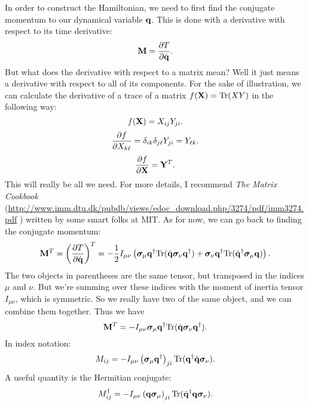 \documentclass[12pt]{article}
\begin{document}
In order to construct the Hamiltonian, we need to first find the conjugate 
momentum to our dynamical variable $\mathbf{q}$. This is done with a derivative with 
respect to its time derivative:
\[ \mathbf{M} = \frac{\partial {T}}{\partial {\dot{\mathbf{q}}}}.\]
But what does the derivative with respect to a matrix mean? Well it just means 
a derivative with respect to all of its components. For the sake of 
illustration, we can calculate the derivative of a trace of a matrix $f(\mathbf{X}) 
= \mathrm{Tr}(XY)$ in the following way:
\[ f(\mathbf{X}) = X_{ij}Y_{ji}.\]
\[ \frac{\partial {f}}{\partial {X_{k\ell}}} = \delta_{ik}\delta_{j \ell} Y_{ji} = Y_{\ell k}.\]
\[ \frac{\partial {f}}{\partial {\mathbf{X}}} = \mathbf{Y} ^T.\]
This will really be all we need. For more details, I recommend \emph{The Matrix 
Cookbook} 
(\url{http://www.imm.dtu.dk/pubdb/views/edoc_download.php/3274/pdf/imm3274.pdf}
) written by some smart folks at MIT. As for now, we can go back to finding the 
conjugate momentum:
\[ \mathbf{M}^T = \left(\frac{\partial {T}}{\partial {\dot{\mathbf{q}}}}\right)^T = -\frac{1}{2}I_{\mu\nu} \left( 
\bm{\sigma}_\mu \mathbf{q}^\dagger \mathrm{Tr}(\dot{\mathbf{q}}  \bm{\sigma}_\nu\mathbf{q}^\dagger) + \bm{\sigma}_\nu \mathbf{q}^\dagger \mathrm{Tr}(\dot{\mathbf{q}} ^\dagger \bm{\sigma}_\mu\mathbf{q})\right).\]
The two objects in parentheses are the same tensor, but transposed in the 
indices $\mu$ and $\nu$. But we're summing over these indices with the moment 
of inertia tensor $I_{\mu\nu}$, which is symmetric. So we really have two of 
the same object, and we can combine them together. Thus we have
\[ \mathbf{M}^T = -I_{\mu\nu}\bm{\sigma}_\mu \mathbf{q}^\dagger \mathrm{Tr}(\dot{\mathbf{q}}\bm{\sigma}_\nu \mathbf{q}^\dagger).\]
In index notation:
\[ M_{ij} = -I_{\mu\nu} \left(\bm{\sigma}_\mu \mathbf{q}^\dagger\right)_{ji}\mathrm{Tr}(\mathbf{q}^\dagger \dot{\mathbf{q}}\bm{\sigma}_\nu).\]
A useful quantity is the Hermitian conjugate:
\[ M^\dagger_{ij} = -I_{\mu\nu} \left(\mathbf{q} \bm{\sigma}_\mu\right)_{ji} \mathrm{Tr}(\dot{\mathbf{q}}^\dagger \mathbf{q} \bm{\sigma}_\nu).\]
\end{document}
